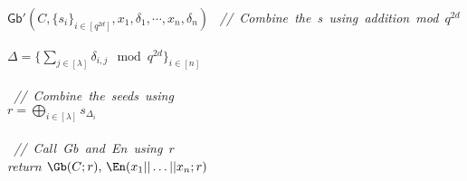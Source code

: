 \documentclass{article}
\newcommand{\comment}[1]{\sl\small\color{black!50} \mbox{ // #1 }}
\begin{document}
\begin{codebox}{$\mathsf{Gb}'(C, \{s_i\}_{i \in [q^{2d}]}, x_1, \delta_1, \cdots, x_n, \delta_n)$}
    \comment{Combine the \delta{}s using addition mod $q^{2d}$}\\
    $\Delta = \{ \sum_{j \in [\lambda]}  \delta_{i,j} \mod q^{2d}\}_{i \in [n]}$\\
    \\
    \comment{Combine the seeds using \Delta}\\
    $r = \bigoplus_{i \in [\lambda]} s_{\Delta_i}$\\
    \\
    \comment{Call \textsf{Gb} and \textsf{En} using $r$}\\
    return $\Gb(C; r),\, \En(x_1 || \dots || x_n; r)$
\end{codebox}
\end{document}

